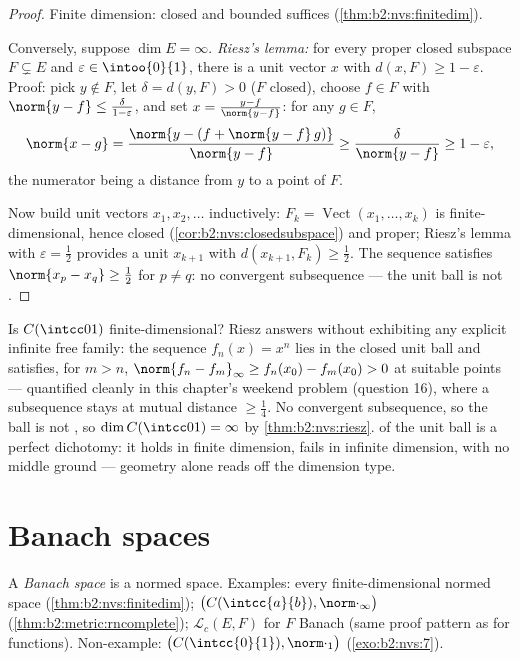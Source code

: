 \begin{proof}
Finite dimension: closed and bounded suffices
(\cref{thm:b2:nvs:finitedim}).

Conversely, suppose $\dim E = \infty$. \emph{Riesz's lemma:} for
every proper closed subspace $F \subsetneq E$ and $\varepsilon \in
\intoo{0}{1}$, there is a unit vector $x$ with $d(x, F) \geq 1 -
\varepsilon$. Proof: pick $y \notin F$, let $\delta = d(y, F) > 0$
($F$ closed), choose $f \in F$ with $\norm{y - f} \leq
\frac{\delta}{1 - \varepsilon}$, and set $x = \frac{y - f}{\norm{y -
f}}$: for any $g \in F$,
\[
\norm{x - g} = \frac{\norm{y - (f + \norm{y-f}\,g)}}{\norm{y - f}}
\geq \frac{\delta}{\norm{y-f}} \geq 1 - \varepsilon ,
\]
the numerator being a distance from $y$ to a point of $F$.

Now build unit vectors $x_1, x_2, \dots$ inductively: $F_k =
\operatorname{Vect}(x_1, \dots, x_k)$ is finite-dimensional, hence
closed (\cref{cor:b2:nvs:closedsubspace}) and proper; Riesz's lemma
with $\varepsilon = \frac12$ provides a unit $x_{k+1}$ with $d(x_{k+1},
F_k) \geq \frac12$. The sequence satisfies $\norm{x_p - x_q} \geq
\frac12$ for $p \neq q$: no convergent subsequence --- the unit ball
is not .
\end{proof}

\begin{example}\label{ex:b2:nvs:rieszdetector}
Is $C(\intcc01)$ finite-dimensional? Riesz answers without
exhibiting any explicit infinite free family: the sequence
$f_n(x) = x^n$ lies in the closed unit ball and satisfies, for
$m > n$, $\norm{f_n - f_m}_\infty \geq f_n(x_0) - f_m(x_0) > 0$
at suitable points --- quantified cleanly in this chapter's
weekend problem (question 16), where a subsequence stays at
mutual distance $\geq \frac14$. No convergent subsequence, so
the ball is not , so $\dim C(\intcc01) = \infty$ by
\cref{thm:b2:nvs:riesz}.  of the unit ball is a
perfect dichotomy: it holds in finite dimension, fails in
infinite dimension, with no middle ground --- geometry alone
reads off the dimension type.
\end{example}

\section{Banach spaces}

\begin{definition}\label{def:b2:nvs:banach}
A \emph{Banach space} is a  normed
space. Examples: every finite-dimensional normed space
(\cref{thm:b2:nvs:finitedim}); $\bigl(C(\intcc{a}{b}),
\norm\cdot_\infty\bigr)$ (\cref{thm:b2:metric:rncomplete});
$\mathcal{L}_c(E, F)$ for $F$ Banach (same proof pattern as for
 functions). Non-example: $\bigl(C(\intcc{0}{1}),
\norm\cdot_1\bigr)$ (\cref{exo:b2:nvs:7}).
\end{definition}

